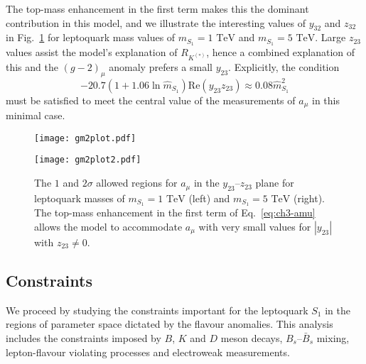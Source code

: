 The top-mass enhancement in the first term makes this the dominant contribution
in this model, and we illustrate the interesting values of $y_{32}$ and $z_{32}$
in Fig.~\ref{fig:ch3-gm2plots} for leptoquark mass values of $m_{S_{1}}=1 \text{ TeV}$
and $m_{S_{1}}=5 \text{ TeV}$. Large $z_{23}$ values assist the model's explanation
of $R_{K^{(*)}}$, hence a combined explanation of this and the $(g-2)_\mu$ anomaly
prefers a small $y_{23}$. Explicitly, the condition~\cite{Bauer:2015knc}
\begin{equation} \label{eq:ch3-bnamueq}
  -20.7 (1 + 1.06 \ln\hat{m}_{S_{1}}) \text{Re}(y_{23} z_{23}) \approx 0.08 \hat{m}_{S_{1}}^2
\end{equation}
must be satisfied to meet the central value of the measurements of $a_\mu$ in
this minimal case.

\begin{figure}[t]
  \centering
\begin{minipage}[t]{.45\linewidth}
\centering \texttt{[image: gm2plot.pdf]}
 \label{fig:ch3-gm2plot}
\end{minipage}%
\hfill
\begin{minipage}[t]{.45\linewidth}
\centering \texttt{[image: gm2plot2.pdf]}
 \label{fig:ch3-gm2plot2}
\end{minipage}
\caption[The $1$ and $2\sigma$ allowed regions for $a_\mu$ in the
$y_{23}$--$z_{23}$ plane for leptoquark masses of $m_{S_{1}} = 1 \text{ TeV}$
(left) and $m_{S_{1}} = 5 \text{ TeV}$ (right).]{The $1$ and $2\sigma$ allowed
  regions for $a_\mu$ in the $y_{23}$--$z_{23}$ plane for leptoquark masses of
  $m_{S_{1}} = 1 \text{ TeV}$ (left) and $m_{S_{1}} = 5 \text{ TeV}$ (right). The
  top-mass enhancement in the first term of Eq.~\eqref{eq:ch3-amu} allows the model
  to accommodate $a_\mu$ with very small values for $|y_{23}|$ with
  $z_{23} \neq 0$.}\label{fig:ch3-gm2plots}
\end{figure}

\subsection{Constraints}
\label{sec:ch3-constraints}

We proceed by studying the constraints important for the leptoquark $S_{1}$ in
the regions of parameter space dictated by the flavour anomalies. This analysis
includes the constraints imposed by $B$, $K$ and $D$ meson decays,
$B_s$--$\bar{B}_s$ mixing, lepton-flavour violating processes and electroweak
measurements.

